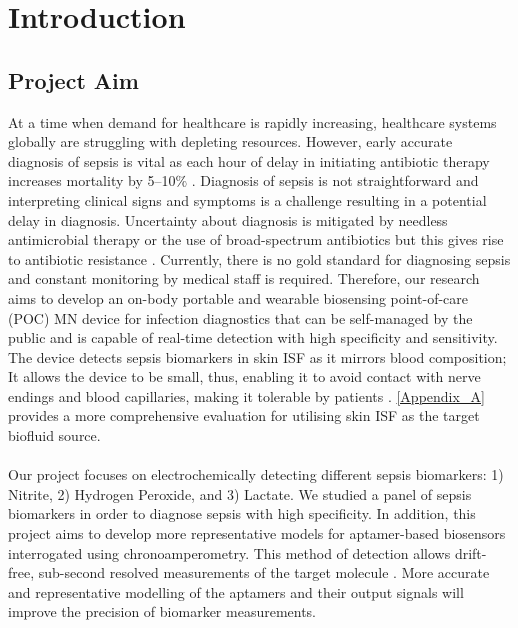 \section{Introduction}
\subsection{Project Aim}
At a time when demand for healthcare is rapidly increasing, healthcare systems globally are struggling with depleting resources. However, early accurate diagnosis of sepsis is vital as each hour of delay in initiating antibiotic therapy increases mortality by 5–10$\%$ \cite{heikenfeld2018lab,bauer2010molecular}. Diagnosis of sepsis is not straightforward and interpreting clinical signs and symptoms is a challenge resulting in a potential delay in diagnosis. Uncertainty about diagnosis is mitigated by needless antimicrobial therapy or the use of broad-spectrum antibiotics but this gives rise to antibiotic resistance \cite{hung2020current}. Currently, there is no gold standard for diagnosing sepsis and constant monitoring by medical staff is required. Therefore, our research aims to develop an on-body portable and wearable biosensing point-of-care (POC) MN device for infection diagnostics that can be self-managed by the public and is capable of real-time detection with high specificity and sensitivity. The device detects sepsis biomarkers in skin ISF as it mirrors blood composition; It allows the device to be small, thus, enabling it to avoid contact with nerve endings and blood capillaries, making it tolerable by patients \cite{liu2020microneedles}. \autoref{Appendix_A} provides a more comprehensive evaluation for utilising skin ISF as the target biofluid source.\\\\
Our project focuses on electrochemically detecting different sepsis biomarkers: 1) Nitrite, 2) Hydrogen Peroxide, and 3) Lactate. We studied a panel of sepsis biomarkers in order to diagnose sepsis with high specificity. In addition, this project aims to develop more representative models for aptamer-based biosensors interrogated using chronoamperometry. This method of detection allows drift-free, sub-second resolved measurements of the target molecule \cite{arroyo2018subsecond}. More accurate and representative modelling of the aptamers and their output signals will improve the precision of biomarker measurements.\\\\